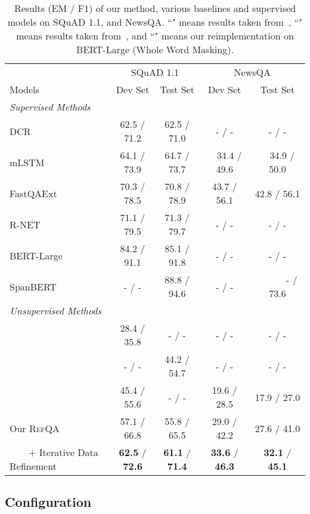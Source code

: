 \documentclass[11pt,a4paper]{article}
\newcommand\refqa{\textsc{RefQA}}
\begin{document}
\begin{table*}[t]
    \centering
    \begin{tabular}{lcccc}
        \toprule
        & \multicolumn{2}{c}{SQuAD 1.1} & \multicolumn{2}{c}{NewsQA} \\
        Models & Dev Set & Test Set & Dev Set & Test Set \\ \midrule
        \multicolumn{5}{l}{\emph{Supervised Methods}} \\
\quad DCR~\citep{yu2016dcr} & 62.5 / 71.2 & 62.5 / 71.0  & - / - & - / - \\
        \quad mLSTM~\citep{wang2016matchlstm} & 64.1 / 73.9 & 64.7 / 73.7 & ~~34.4 / 49.6 & ~~34.9 / 50.0 \\
\quad FastQAExt~\citep{fastqa2017} & 70.3 / 78.5 & 70.8 / 78.9 & 43.7 / 56.1 & 42.8 / 56.1 \\
        \quad R-NET~\citep{wang-rnet} & 71.1 / 79.5 &  71.3 / 79.7  & - / - & - / - \\
        \quad BERT-Large~\citep{BERT} & 84.2 / 91.1 &  85.1 / 91.8  & - / - & - / - \\ 
        \quad SpanBERT~\citep{spanbert} & - / - & 88.8 / 94.6 & - / - & ~~~~~~- / 73.6 \\
        \midrule
        \multicolumn{5}{l}{\emph{Unsupervised Methods}} \\
        \quad~\citet{dhingra2019semi} & 28.4 / 35.8 & - / - & - / - & - / -\\
        \quad~\citet{lewis2019unsupervisedqa} & - / - & 44.2 / 54.7 & - / - & - / - \\
        \quad~\citet{lewis2019unsupervisedqa} & 45.4 / 55.6 & - / - & 19.6 / 28.5 & 17.9 / 27.0 \\
        \quad Our \refqa{}  & 57.1 / 66.8 & 55.8 / 65.5 & 29.0 / 42.2 & 27.6 / 41.0 \\
        \quad ~~~~+ Iterative Data Refinement & \textbf{62.5} / \textbf{72.6} & \textbf{61.1} / \textbf{71.4} & \textbf{33.6} / \textbf{46.3} & \textbf{32.1} / \textbf{45.1}\\
        \bottomrule
    \end{tabular}
    \caption{Results (EM / F1) of our method, various baselines and supervised models on SQuAD 1.1, and NewsQA. ``" means results taken from~\citet{newsqa2017}, ``" means results taken from~\citet{lewis2019unsupervisedqa}, and ``" means our reimplementation on BERT-Large (Whole Word Masking).}
    \label{tab:mainresult}
\end{table*}

\subsection{Configuration}
\end{document}
